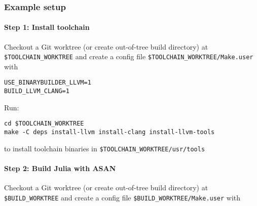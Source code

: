 \hypertarget{3406286911383043950}{}


\subsubsection{Example setup}



\hypertarget{442822451198415909}{}


\paragraph{Step 1: Install toolchain}



Checkout a Git worktree (or create out-of-tree build directory) at \texttt{\$TOOLCHAIN\_WORKTREE} and create a config file \texttt{\$TOOLCHAIN\_WORKTREE/Make.user} with




\begin{lstlisting}
USE_BINARYBUILDER_LLVM=1
BUILD_LLVM_CLANG=1
\end{lstlisting}



Run:




\begin{lstlisting}
cd $TOOLCHAIN_WORKTREE
make -C deps install-llvm install-clang install-llvm-tools
\end{lstlisting}



to install toolchain binaries in \texttt{\$TOOLCHAIN\_WORKTREE/usr/tools}



\hypertarget{11712997947190658584}{}


\paragraph{Step 2: Build Julia with ASAN}



Checkout a Git worktree (or create out-of-tree build directory) at \texttt{\$BUILD\_WORKTREE} and create a config file \texttt{\$BUILD\_WORKTREE/Make.user} with




